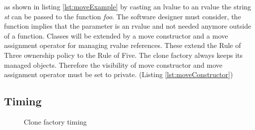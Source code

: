 { 

\noindent as shown in listing \ref{lst:moveExample} by casting an lvalue to an rvalue the string \emph{st} can be passed to the function \emph{foo}. The software designer must consider, the function implies that the parameter is an rvalue and not needed anymore outside of a function. Classes will be extended by a move constructor and a move assignment operator for managing rvalue references. These extend the Rule of Three ownership policy to the Rule of Five. The clone factory always keeps its managed objects. Therefore the visibility of  move constructor and move assignment operator must be set to private. (Listing \ref{lst:moveConstructor})

\newpage

 

\newpage

\subsection{Timing}\label{sec:timingCloneFactory}

\begin{figure}[h]{}
\centering
\mbox{}
\caption{Clone factory timing}
\label{fig:cloneFactoryTiming}
\end{figure}

}
